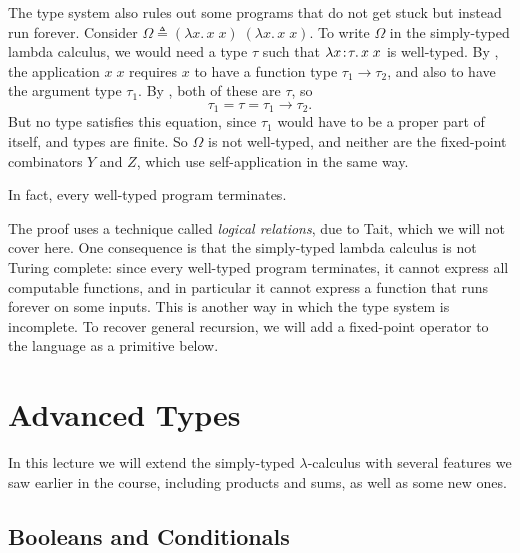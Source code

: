 The type system also rules out some programs that do not get stuck but instead run forever. Consider $\Omega \triangleq (\lambda x.\, x\; x)\;(\lambda x.\, x\; x)$. To write $\Omega$ in the simply-typed lambda calculus, we would need a type $\tau$ such that $\lambda x\!:\!\tau.\, x\; x$ is well-typed. By , the application $x\; x$ requires $x$ to have a function type $\tau_1 \to \tau_2$, and also to have the argument type $\tau_1$. By , both of these are $\tau$, so
\[
\tau_1 = \tau = \tau_1 \to \tau_2.
\]
But no type satisfies this equation, since $\tau_1$ would have to be a proper part of itself, and types are finite. So $\Omega$ is not well-typed, and neither are the fixed-point combinators $Y$ and $Z$, which use self-application in the same way.

In fact, every well-typed program terminates.


The proof uses a technique called \emph{logical relations}, due to Tait, which we will not cover here. One consequence is that the simply-typed lambda calculus is not Turing complete: since every well-typed program terminates, it cannot express all computable functions, and in particular it cannot express a function that runs forever on some inputs. This is another way in which the type system is incomplete. To recover general recursion, we will add a fixed-point operator to the language as a primitive below.

\section{Advanced Types}

In this lecture we will extend the simply-typed $\lambda$-calculus with several features we saw earlier in the course, including products and sums, as well as some new ones.

\subsection{Booleans and Conditionals}

